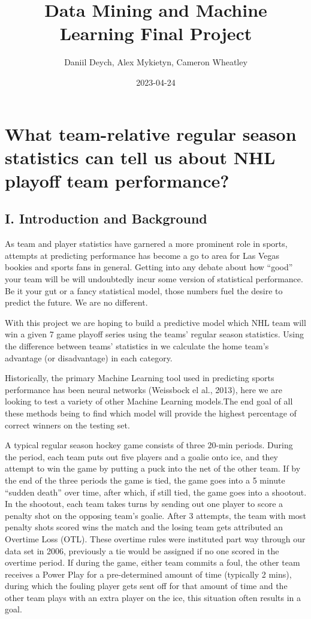 \documentclass[
]{article}
\title{Data Mining and Machine Learning Final Project}
\author{Daniil Deych, Alex Mykietyn, Cameron Wheatley}
\date{2023-04-24}
\begin{document}
\maketitle

\hypertarget{what-team-relative-regular-season-statistics-can-tell-us-about-nhl-playoff-team-performance}{%
\section{What team-relative regular season statistics can tell us about
NHL playoff team
performance?}\label{what-team-relative-regular-season-statistics-can-tell-us-about-nhl-playoff-team-performance}}

\hypertarget{i.-introduction-and-background}{%
\subsection{I. Introduction and
Background}\label{i.-introduction-and-background}}

As team and player statistics have garnered a more prominent role in
sports, attempts at predicting performance has become a go to area for
Las Vegas bookies and sports fans in general. Getting into any debate
about how ``good'' your team will be will undoubtedly incur some version
of statistical performance. Be it your gut or a fancy statistical model,
those numbers fuel the desire to predict the future. We are no
different.

With this project we are hoping to build a predictive model which NHL
team will win a given 7 game playoff series using the teams' regular
season statistics. Using the difference between teams' statistics in we
calculate the home team's advantage (or disadvantage) in each category.

Historically, the primary Machine Learning tool used in predicting
sports performance has been neural networks (Weissbock el al., 2013),
here we are looking to test a variety of other Machine Learning
models.The end goal of all these methods being to find which model will
provide the highest percentage of correct winners on the testing set.

A typical regular season hockey game consists of three 20-min periods.
During the period, each team puts out five players and a goalie onto
ice, and they attempt to win the game by putting a puck into the net of
the other team. If by the end of the three periods the game is tied, the
game goes into a 5 minute ``sudden death'' over time, after which, if
still tied, the game goes into a shootout. In the shootout, each team
takes turns by sending out one player to score a penalty shot on the
opposing team's goalie. After 3 attempts, the team with most penalty
shots scored wins the match and the losing team gets attributed an
Overtime Loss (OTL). These overtime rules were instituted part way
through our data set in 2006, previously a tie would be assigned if no
one scored in the overtime period. If during the game, either team
commits a foul, the other team receives a Power Play for a
pre-determined amount of time (typically 2 mins), during which the
fouling player gets sent off for that amount of time and the other team
plays with an extra player on the ice, this situation often results in a
goal.
\end{document}
